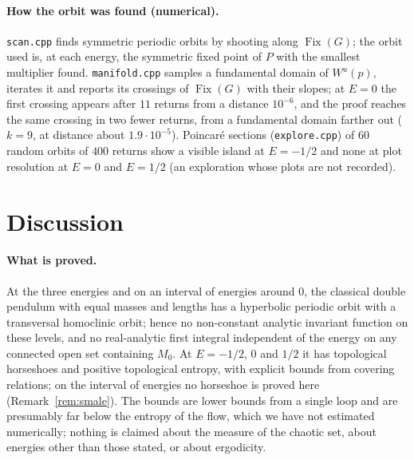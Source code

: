 \documentclass[11pt]{article}
\theoremstyle{definition}
\newcommand{\Fix}{\operatorname{Fix}}
\begin{document}
\paragraph{How the orbit was found (numerical).} \texttt{scan.cpp} finds symmetric periodic orbits by shooting along $\Fix(G)$; the orbit used is, at each energy, the symmetric fixed point of $P$ with the smallest multiplier found. \texttt{manifold.cpp} samples a fundamental domain of $W^u(p)$, iterates it and reports its crossings of $\Fix(G)$ with their slopes; at $E = 0$ the first crossing appears after $11$ returns from a distance $10^{-6}$, and the proof reaches the same crossing in two fewer returns, from a fundamental domain farther out ($k = 9$, at distance about $1.9\cdot10^{-5}$). Poincar\'e sections (\texttt{explore.cpp}) of $60$ random orbits of $400$ returns show a visible island at $E = -1/2$ and none at plot resolution at $E = 0$ and $E = 1/2$ (an exploration whose plots are not recorded).

\section{Discussion}\label{sec:discussion}

\paragraph{What is proved.} At the three energies and on an interval of energies around $0$, the classical double pendulum with equal masses and lengths has a hyperbolic periodic orbit with a transversal homoclinic orbit; hence no non-constant analytic invariant function on these levels, and no real-analytic first integral independent of the energy on any connected open set containing $M_0$. At $E = -1/2$, $0$ and $1/2$ it has topological horseshoes and positive topological entropy, with explicit bounds from covering relations; on the interval of energies no horseshoe is proved here (Remark~\ref{rem:smale}). The bounds are lower bounds from a single loop and are presumably far below the entropy of the flow, which we have not estimated numerically; nothing is claimed about the measure of the chaotic set, about energies other than those stated, or about ergodicity.
\end{document}
